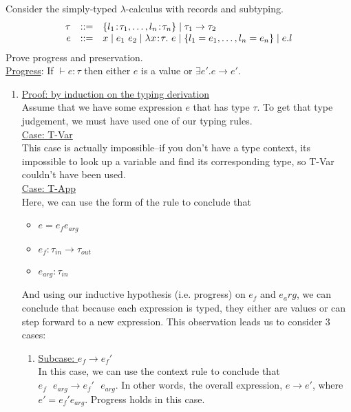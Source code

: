 \documentclass[10pt]{article}
\begin{document}
\begin{exercise}
  Consider the simply-typed $\lambda$-calculus with records and
  subtyping.
%
\[
\begin{array}{rcl}
\tau & ::= & \{ l_1 \!:\! \tau_1, \dots, l_n \!:\! \tau_n \} \mid \tau_1 \rightarrow \tau_2\\
e    & ::= & x \mid e_1~e_2 \mid \lambda x \!:\!\tau .~ e \mid \{ l_1 = e_1 , \dots, l_n = e_n \} \mid e.l\\
\end{array}
\]
%
Prove progress and preservation. \\

\noindent \underline{Progress}: If $\vdash e:\tau$ then either $e$ is a value or $\exists e'. e \rightarrow e'$. \\

\begin{enumerate}[\hspace{20pt}]

\item 
\underline{Proof: by induction on the typing derivation} \\

Assume that we have some expression $e$ that has type $\tau$. To get that type 
judgement, we must have used one of our typing rules. \\


\underline{Case: T-Var} \\
This case is actually impossible--if you don't have a type context, its impossible to look up a variable and find its corresponding type, so T-Var couldn't have been used. \checkmark \checkmark \\

\underline{Case: T-App} \\
Here, we can use the form of the rule to conclude that 
\begin{itemize}
	\item $e = e_f e_{arg}$
	\item $e_f: \tau_{in} \rightarrow \tau_{out}$
	\item $e_{arg}: \tau_{in}$
\end{itemize}

And using our inductive hypothesis (i.e. progress) on $e_f$ and $e_arg$, we can conclude that because each expression is typed, they either are values or can step
forward to a new expression. This observation leads us to consider 3 cases:\\

\begin{enumerate}[\hspace{20pt}]
	\item
	\underline{Subcase: $e_f \rightarrow e_f'$} \\
	In this case, we can use the context
	rule to conclude that $e_f \text{ } e_{arg} \rightarrow e_f' \text{ } e_{arg}$. 
	In other words, the
	overall expression, $e \rightarrow e'$, where $e' = e_f' e_{arg}$. Progress holds
	in this case. \checkmark \\
	

\end{enumerate}
\end{enumerate}
\end{exercise}
\end{document}
